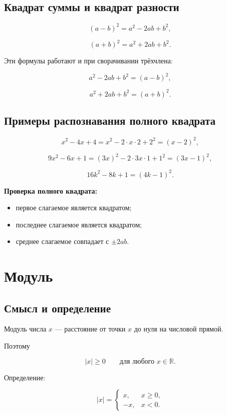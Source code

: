 \documentclass[a4paper,12pt]{article}
\newcommand{\R}{\mathbb{R}}
\begin{document}
\subsection{Квадрат суммы и квадрат разности}

\[
(a-b)^2
=
a^2-2ab+b^2,
\]

\[
(a+b)^2
=
a^2+2ab+b^2.
\]

Эти формулы работают и при сворачивании трёхчлена:

\[
a^2-2ab+b^2
=
(a-b)^2,
\]

\[
a^2+2ab+b^2
=
(a+b)^2.
\]

\subsection{Примеры распознавания полного квадрата}

\[
x^2-4x+4
=
x^2-2\cdot x\cdot2+2^2
=
(x-2)^2,
\]

\[
9x^2-6x+1
=
(3x)^2-2\cdot3x\cdot1+1^2
=
(3x-1)^2,
\]

\[
16k^2-8k+1
=
(4k-1)^2.
\]

\textbf{Проверка полного квадрата:}

\begin{itemize}
\item первое слагаемое является квадратом;
\item последнее слагаемое является квадратом;
\item среднее слагаемое совпадает с $\pm2ab$.
\end{itemize}


\section{Модуль}

\subsection{Смысл и определение}

Модуль числа $x$ --- расстояние от точки $x$
до нуля на числовой прямой.

Поэтому

\[
|x|\ge0
\qquad
\text{для любого }x\in\R.
\]

Определение:

\[
|x|=
\begin{cases}
x, & x\ge0,\\
-x, & x<0.
\end{cases}
\]
\end{document}

